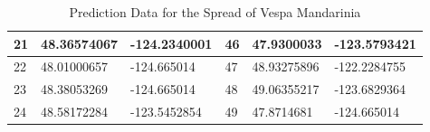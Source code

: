 \documentclass{mcmthesis}
\begin{document}
\begin{appendices}
\begin{table}[htbp]
\begin{tabular}{|l|l|l|l|l|l|}
21 & 48.36574067 & -124.2340001 & 46 & 47.9300033  & -123.5793421 \\ \hline
22 & 48.01000657 & -124.665014  & 47 & 48.93275896 & -122.2284755 \\ \hline
23 & 48.38053269 & -124.665014  & 48 & 49.06355217 & -123.6829364 \\ \hline
24 & 48.58172284 & -123.5452854 & 49 & 47.8714681  & -124.665014  \\ \hline
\end{tabular}
\caption{Prediction Data for the Spread of Vespa Mandarinia}
\label{tab:PD1}
\end{table}



\end{appendices}
\end{document}
